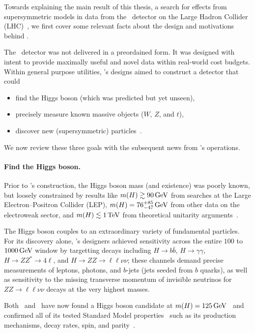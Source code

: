 \noindent Towards explaining the main result of this thesis,
a search for effects from supersymmetric models
in data from the \atlas\ detector
on the Large Hadron Collider (LHC)~\cite{
atlas2022searches,
atlas2008experiment,
lhc2008machine
},
we first cover some relevant facts about the design and motivations
behind \atlas.

The \atlas\ detector was not delivered in a preordained form.
It was designed with intent to provide maximally useful and novel data within
real-world cost budgets.
Within general purpose utilities, \atlas's designs aimed to construct a
detector that could
\begin{itemize}
\item find the Higgs boson (which was predicted but yet unseen),
\item precisely measure known massive objects ($W$, $Z$, and $t$),
\item discover new (supersymmetric) particles~\cite{atlas1999design1}.
\end{itemize}
We now review these three goals with the subsequent news from \atlas's
operations.

\paragraph{Find the Higgs boson.}
Prior to \atlas's construction, the Higgs boson mass (and existence) was
poorly known, but loosely constrained by results like
$m(H) \gtrsim 90\,\eV[G]$ from searches at the
Large Electron–Positron Collider (LEP),
$m(H) = 76^{+85}_{-47}\,\eV[G]$ from other data on the electroweak sector,
and $m(H) \lesssim 1\,\eV[T]$ from theoretical unitarity arguments~\cite{
atlas1999design2,
ghinculov1998perturb,
lep1999ewk
}.

The Higgs boson couples to an extraordinary variety of fundamental particles.
For its discovery alone, \atlas's designers achieved sensitivity across the
entire $100$ to $1000\,\eV[G]$ window by targetting decays including
$H\to b\bar b$,
$H\to \gamma\gamma$,
$H\to ZZ^* \to 4\ell$, and
$H\to ZZ \to \ell\ell\nu\nu$;
these channels demand precise measurements of leptons, photons, and
$b$-jets (jets seeded from $b$ quarks), as well as sensitivity to the missing
transverse momentum of invisible neutrinos for $ZZ \to \ell\ell\nu\nu$ decays
at the very highest masses.

Both \atlas\ and \cms\ have now found a Higgs boson candidate at
$m(H) = 125\,\eV[G]$~\cite{
atlas2012higgs,
atlas2012combined,
cms2012higgs
}
and confirmed all of its tested Standard Model properties~\cite{
combined2016higgs,
atlas2022ten,
cms2022ten
}
such as its production mechanisms, decay rates,
spin, and parity~\cite{
HIGG-2013-01,
HIGG-2013-17,
HIGG-2014-06
}.

